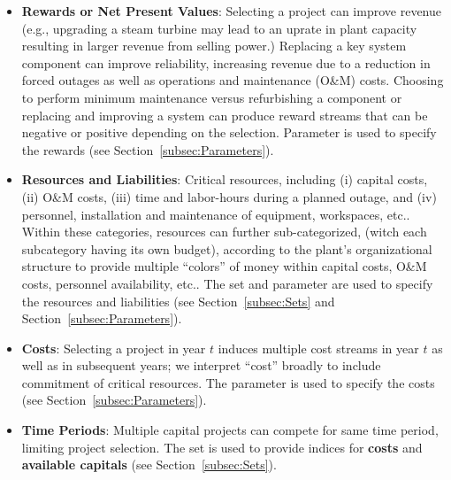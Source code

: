 \begin{itemize}
  \item \textbf{Rewards or Net Present Values}: Selecting a project can improve revenue (e.g.,
  upgrading a steam turbine may lead to an uprate in plant capacity resulting in larger
  revenue from selling power.) Replacing a key system component can improve reliability,
  increasing revenue due to a reduction in forced outages as well as operations and
  maintenance (O\&M) costs. Choosing to perform minimum maintenance versus refurbishing
  a component or replacing and improving a system can produce reward streams that
  can be negative or positive depending on the selection. Parameter
   is used to specify the rewards (see Section~\ref{subsec:Parameters}).

  \item \textbf{Resources and Liabilities}: Critical resources, including (i) capital costs,
  (ii) O\&M costs, (iii) time and labor-hours during a planned outage, and (iv) personnel,
  installation and maintenance of equipment, workspaces, etc.. Within these categories, resources
  can further sub-categorized, (witch each subcategory having its own budget), according to the plant’s organizational
  structure to provide multiple “colors” of money within capital costs, O\&M costs,
  personnel availability, etc.. The set  and parameter
   are used to specify the resources and
  liabilities (see Section~\ref{subsec:Sets} and Section~\ref{subsec:Parameters}).

  \item \textbf{Costs}: Selecting a project in year $t$ induces multiple
  cost streams in year $t$ as well as in subsequent years; we interpret “cost” broadly to
  include commitment of critical resources. The parameter  is used to specify
  the costs (see Section~\ref{subsec:Parameters}).

  \item \textbf{Time Periods}: Multiple capital projects can compete for same time period,
  limiting project selection. The set  is used to provide indices for
  \textbf{costs} and \textbf{available capitals} (see Section~\ref{subsec:Sets}).


\end{itemize}
